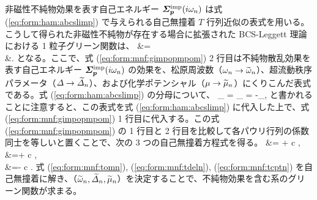 非磁性不純物効果を表す自己エネルギー $\bm{\varSigma}^{\text{imp}}_{\bm{p}}(i\omega_n)$ は式 (\ref{eq:form:ham:abcslimp}) で与えられる自己無撞着 $T$ 行列近似の表式を用いる。こうして得られた非磁性不純物が存在する場合に拡張された BCS-Leggett 理論における 1 粒子グリーン関数は、
\beq
\bgimppom &= \notag\\
&\equiv {}.\label{eq:form:mnf:gimpopmpom}
\eeq
となる。ここで、式 (\ref{eq:form:mnf:gimpopmpom}) 2 行目は不純物散乱効果を表す自己エネルギー $\bm{\varSigma}^{\text{imp}}_{\bm{p}}(i\omega_n)$ の効果を、松原周波数（$\omega_n \to \widetilde{\omega}_n$）、超流動秩序パラメータ（$\varDelta \to \widetilde{\varDelta}_n$）、および化学ポテンシャル（$\mu \to \widetilde{\mu}_n$）にくりこんだ表式である。式 (\ref{eq:form:ham:abcslimp}) の分母について、
\beq
\sum_{\bp} \bgimppom = \sum_{\bp}  = -\sum_{\bp},\label{eq:form:mnf:sumg}
\eeq
と書かれることに注意すると、この表式を式 (\ref{eq:form:ham:abcslimp}) に代入した上で、式 (\ref{eq:form:mnf:gimpopmpom}) 1 行目に代入する。この式 (\ref{eq:form:mnf:gimpopmpom}) の 1 行目と 2 行目を比較して各パウリ行列の係数同士を等しいと置くことで、次の 3 つの自己無撞着方程式を得る。
\beq
\tomn &= \omn + c ,\label{eq:form:mnf:tomn}\\
\tdeln &=\del + c ,\label{eq:form:mnf:tdeln}\\
\tcptn &=\cpt - c .\label{eq:form:mnf:tcptn}
\eeq
式 (\ref{eq:form:mnf:tomn}), (\ref{eq:form:mnf:tdeln}), (\ref{eq:form:mnf:tcptn}) を自己無撞着に解き、（$\widetilde{\omega}_n, \widetilde{\varDelta}_n, \widetilde{\mu}_n$）を決定することで、不純物効果を含む系のグリーン関数が求まる。

